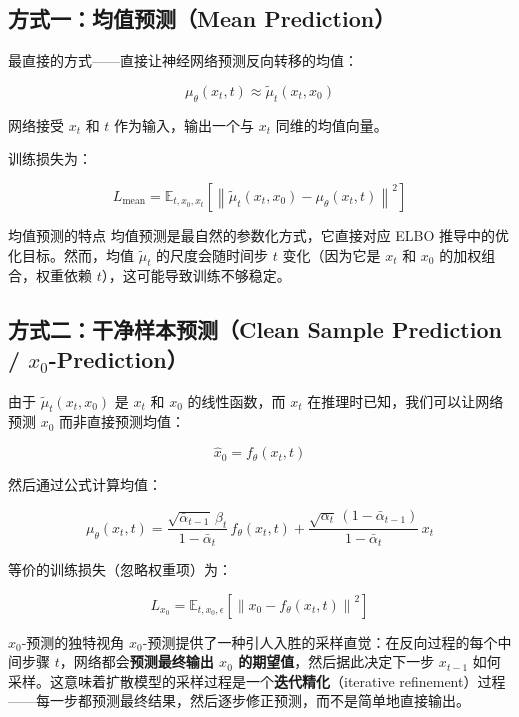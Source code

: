 \documentclass[a4paper]{article}
\begin{document}
\subsection{方式一：均值预测（Mean Prediction）}

最直接的方式——直接让神经网络预测反向转移的均值：

$$\mu_\theta(x_t, t) \approx \tilde{\mu}_t(x_t, x_0)$$

网络接受 $x_t$ 和 $t$ 作为输入，输出一个与 $x_t$ 同维的均值向量。

训练损失为：

$$L_{\text{mean}} = \mathbb{E}_{t, x_0, x_t}\left[\left\| \tilde{\mu}_t(x_t, x_0) - \mu_\theta(x_t, t) \right\|^2\right]$$

\begin{knowledgebox}{均值预测的特点}
均值预测是最自然的参数化方式，它直接对应 ELBO 推导中的优化目标。然而，均值 $\tilde{\mu}_t$ 的尺度会随时间步 $t$ 变化（因为它是 $x_t$ 和 $x_0$ 的加权组合，权重依赖 $t$），这可能导致训练不够稳定。
\end{knowledgebox}

\subsection{方式二：干净样本预测（Clean Sample Prediction / $x_0$-Prediction）}

由于 $\tilde{\mu}_t(x_t, x_0)$ 是 $x_t$ 和 $x_0$ 的线性函数，而 $x_t$ 在推理时已知，我们可以让网络预测 $x_0$ 而非直接预测均值：

$$\hat{x}_0 = f_\theta(x_t, t)$$

然后通过公式计算均值：

$$\mu_\theta(x_t, t) = \frac{\sqrt{\bar{\alpha}_{t-1}}\, \beta_t}{1 - \bar{\alpha}_t}\, f_\theta(x_t, t) + \frac{\sqrt{\alpha_t}\, (1 - \bar{\alpha}_{t-1})}{1 - \bar{\alpha}_t}\, x_t$$

等价的训练损失（忽略权重项）为：

$$L_{x_0} = \mathbb{E}_{t, x_0, \epsilon}\left[\left\| x_0 - f_\theta(x_t, t) \right\|^2\right]$$

\begin{importantbox}{$x_0$-预测的独特视角}
$x_0$-预测提供了一种引人入胜的采样直觉：在反向过程的每个中间步骤 $t$，网络都会\textbf{预测最终输出 $x_0$ 的期望值}，然后据此决定下一步 $x_{t-1}$ 如何采样。这意味着扩散模型的采样过程是一个\textbf{迭代精化}（iterative refinement）过程——每一步都预测最终结果，然后逐步修正预测，而不是简单地直接输出。
\end{importantbox}
\end{document}

